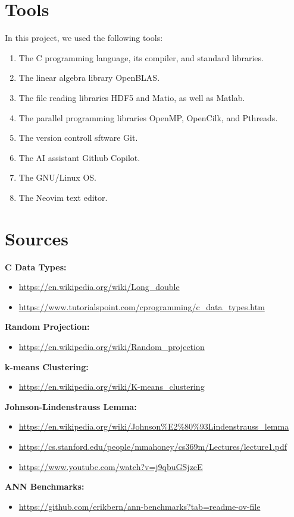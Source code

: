 \documentclass{article}
\begin{document}
\section{Tools}
In this project, we used the following tools:
\begin{enumerate}
    \item The C programming language, its compiler, and standard libraries.
    \item The linear algebra library OpenBLAS.
    \item The file reading libraries HDF5 and Matio, as well as Matlab.
    \item The parallel programming libraries OpenMP, OpenCilk, and Pthreads.
    \item The version controll sftware Git.
    \item The AI assistant Github Copilot.
    \item The GNU/Linux OS.
    \item The Neovim text editor.
\end{enumerate}

\section{Sources}

\textbf{C Data Types:}
\begin{itemize}
    \item  \url{https://en.wikipedia.org/wiki/Long_double}
    \item  \url{https://www.tutorialspoint.com/cprogramming/c_data_types.htm}
\end{itemize}
    
\textbf{Random Projection:}
\begin{itemize}
    \item  \url{https://en.wikipedia.org/wiki/Random_projection}
\end{itemize}

\textbf{k-means Clustering:}
\begin{itemize}
    \item \url{https://en.wikipedia.org/wiki/K-means_clustering}
\end{itemize}

\textbf{Johnson-Lindenstrauss Lemma:}
\begin{itemize}
    \item \url{https://en.wikipedia.org/wiki/Johnson%E2%80%93Lindenstrauss_lemma}
    \item \url{https://cs.stanford.edu/people/mmahoney/cs369m/Lectures/lecture1.pdf}
    \item \url{https://www.youtube.com/watch?v=j9qbuGSjzeE}
\end{itemize}

\textbf{ANN Benchmarks:}
\begin{itemize}
    \item \url{https://github.com/erikbern/ann-benchmarks?tab=readme-ov-file}
\end{itemize}
\end{document}
